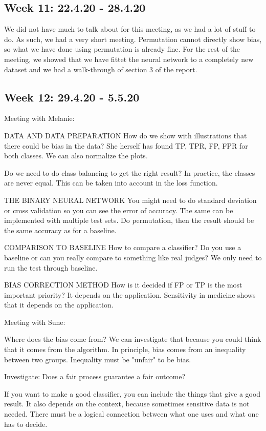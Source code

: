 \documentclass[11pt, fleqn]{article}
\begin{document}
\subsection*{Week 11: 22.4.20 - 28.4.20}
We did not have much to talk about for this meeting, as we had a lot of stuff to do. As such, we had a very short meeting. Permutation cannot directly show bias, so what we have done using permutation is already fine. For the rest of the meeting, we showed that we have fittet the neural network to a completely new dataset and we had a walk-through of section 3 of the report.

\subsection*{Week 12: 29.4.20 - 5.5.20}
Meeting with Melanie:

DATA AND DATA PREPARATION
How do we show with illustrations that there could be bias in the data?
She herself has found TP, TPR, FP, FPR for both classes. We can also normalize the plots.


Do we need to do class balancing to get the right result?
In practice, the classes are never equal. This can be taken into account in the loss function.

THE BINARY NEURAL NETWORK
You might need to do standard deviation or cross validation so you can see the error of accuracy.
The same can be implemented with multiple test sets.
Do permutation, then the result should be the same accuracy as for a baseline.

COMPARISON TO BASELINE
How to compare a classifier? Do you use a baseline or can you really compare to something like real judges?
We only need to run the test through baseline.


BIAS CORRECTION METHOD
How is it decided if FP or TP is the most important priority?
It depends on the application.
Sensitivity in medicine shows that it depends on the application.


Meeting with Sune:

Where does the bias come from?
We can investigate that because you could think that it comes from the algorithm. In principle, bias comes from an inequality between two groups. Inequality must be "unfair" to be bias.

Investigate: Does a fair process guarantee a fair outcome?

If you want to make a good classifier, you can include the things that give a good result. It also depends on the context, because sometimes sensitive data is not needed.
There must be a logical connection between what one uses and what one has to decide.
\end{document}

